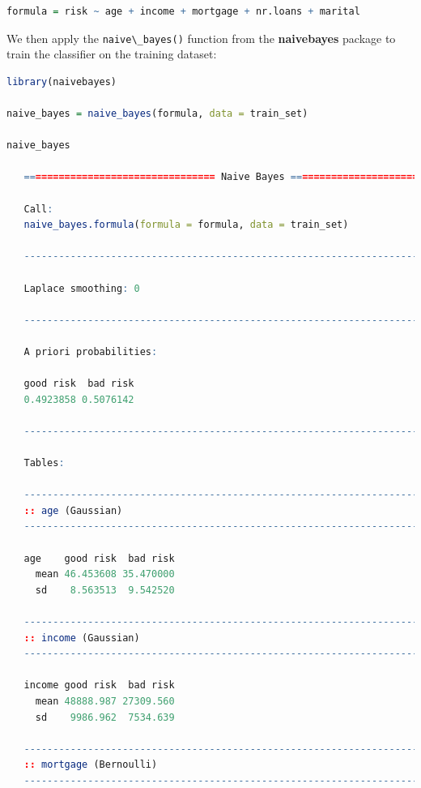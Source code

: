 \documentclass[
]{book}
\newcommand{\passthrough}[1]{#1}
\theoremstyle{definition}
\theoremstyle{definition}
\theoremstyle{definition}
\theoremstyle{definition}
\theoremstyle{remark}
\begin{document}
\begin{lstlisting}[language=R]
formula = risk ~ age + income + mortgage + nr.loans + marital
\end{lstlisting}

We then apply the \passthrough{\lstinline!naive\_bayes()!} function from the \textbf{naivebayes} package to train the classifier on the training dataset:

\begin{lstlisting}[language=R]
library(naivebayes)

naive_bayes = naive_bayes(formula, data = train_set)

naive_bayes
   
   ================================= Naive Bayes ==================================
   
   Call:
   naive_bayes.formula(formula = formula, data = train_set)
   
   -------------------------------------------------------------------------------- 
    
   Laplace smoothing: 0
   
   -------------------------------------------------------------------------------- 
    
   A priori probabilities: 
   
   good risk  bad risk 
   0.4923858 0.5076142 
   
   -------------------------------------------------------------------------------- 
    
   Tables: 
   
   -------------------------------------------------------------------------------- 
   :: age (Gaussian) 
   -------------------------------------------------------------------------------- 
         
   age    good risk  bad risk
     mean 46.453608 35.470000
     sd    8.563513  9.542520
   
   -------------------------------------------------------------------------------- 
   :: income (Gaussian) 
   -------------------------------------------------------------------------------- 
         
   income good risk  bad risk
     mean 48888.987 27309.560
     sd    9986.962  7534.639
   
   -------------------------------------------------------------------------------- 
   :: mortgage (Bernoulli) 
   -------------------------------------------------------------------------------- 
           

\end{lstlisting}
\end{document}
